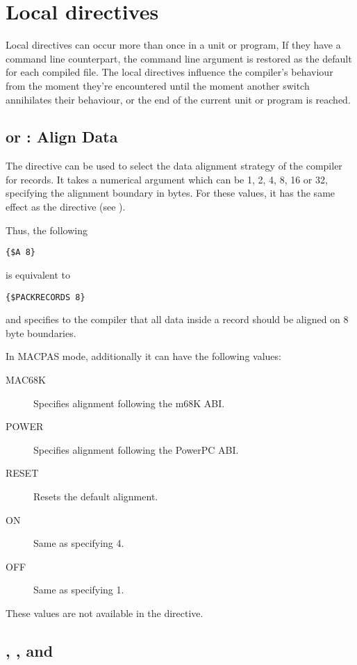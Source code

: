 \section{Local directives}
\label{se:LocalSwitch}
Local directives can occur more than once in a unit or program,
If they have a command line counterpart, the command line argument is
restored as the default for each compiled file. The local directives
influence the compiler's behaviour from the moment they're encountered
until the moment another switch annihilates their behaviour, or the end
of the current unit or program is reached.

\subsection{ or  : Align Data}
\label{se:Align}

The  directive can be used to select the data alignment 
strategy of the compiler for records. It takes a numerical argument
which can be 1, 2, 4, 8, 16 or 32, specifying the alignment boundary 
in bytes. For these values, it has the same effect as the 
 directive (see ).

Thus, the following
\begin{verbatim}
{$A 8}
\end{verbatim}
is equivalent to 
\begin{verbatim}
{$PACKRECORDS 8}
\end{verbatim}
and specifies to the compiler that all data inside a record should be aligned on 
8 byte boundaries.

In MACPAS mode, additionally it can have the following values:
\begin{description}
\item[MAC68K] Specifies alignment following the m68K ABI.
\item[POWER] Specifies alignment following the PowerPC ABI.
\item[RESET] Resets the default alignment.
\item[ON] Same as specifying 4.
\item[OFF] Same as specifying 1.
\end{description}
These values are not available in the  directive. 

\subsection{, , and }
\label{se:An}

